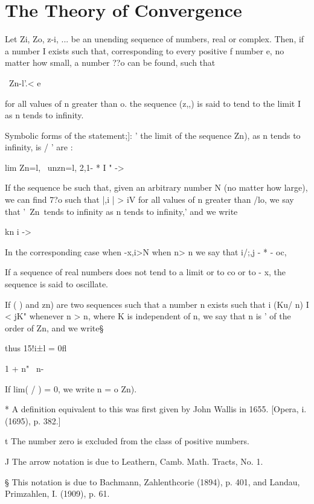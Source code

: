 %
%
\chapter{The Theory of Convergence}


Let Zi, Zo, z-i, ... be an unending sequence of numbers, real or
complex. Then, if a number I exists such that, corresponding to every
positive f number e, no matter how small, a number ??o can be found,
such that

\ Zn-l'.< e

for all values of n greater than o. the sequence (z,,) is said to tend
to the limit I as n tends to infinity.

Symbolic forms of the statement;]: ' the limit of the sequence Zn), as
n tends to infinity, is / ' are :

lim Zn=l, \ unzn=l, 2,1- * I " ->

If the sequence be such that, given an arbitrary number N (no matter
how large), we can find 7?o such that |,i | > iV for all values of n
greater than /lo, we say that '\ Zn\ tends to infinity as n tends to
infinity,' and we write

kn i ->

In the corresponding case when -x,i>N when n> n we say that i/;,j - *
- oc,

If a sequence of real numbers does not tend to a limit or to co or to
- x, the sequence is said to oscillate.


If ( ) and zn) are two sequences such that a number n exists such
that i (Ku/ n) I < jK" whenever n > n, where K is independent of n,
we say that n is ' of the order of Zn, and we write§

thus 15!i±l = 0fl

1 + n" \ n-

If lim( / ) = 0, we write n = o Zn).

* A definition equivalent to this was first given by John Wallis in
1655. [Opera, i. (1695), p. 382.]

t The number zero is excluded from the class of positive numbers.

J The arrow notation is due to Leathern, Camb. Math. Tracts, No. 1.

§ This notation is due to Bachmann, Zahlenthcorie (1894), p. 401, and
Landau, Primzahlen, I. (1909), p. 61.

